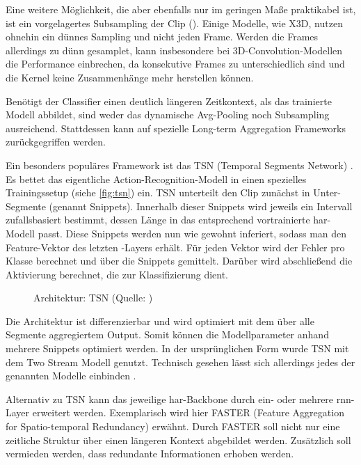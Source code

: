 Eine weitere Möglichkeit, die aber ebenfalls nur im geringen Maße praktikabel ist, ist ein vorgelagertes Subsampling der Clip (\cite{Ng15}).
Einige Modelle, wie X3D, nutzen ohnehin ein dünnes Sampling und nicht jeden Frame.
Werden die Frames allerdings zu dünn gesamplet, kann insbesondere bei 3D-Convolution-Modellen die Performance einbrechen, da konsekutive Frames zu unterschiedlich sind und die Kernel keine Zusammenhänge mehr herstellen können.

Benötigt der Classifier einen deutlich längeren Zeitkontext, als das trainierte Modell abbildet, sind weder das dynamische Avg-Pooling noch Subsampling ausreichend.
Stattdessen kann auf spezielle Long-term Aggregation Frameworks zurückgegriffen werden.

Ein besonders populäres Framework ist das TSN (Temporal Segments Network) \cite{Wang16} \cite{Wang19}.
Es bettet das eigentliche Action-Recognition-Modell in einen spezielles Trainingssetup (siehe \autoref{fig:tsn}) ein.
TSN unterteilt den Clip zunächst in Unter-Segmente (genannt Snippets).
Innerhalb dieser Snippets wird jeweils ein Intervall zufallsbasiert bestimmt, dessen Länge in das entsprechend vortrainierte \gls{har}-Modell passt.
Diese Snippets werden nun wie gewohnt inferiert, sodass man den Feature-Vektor des letzten \fc-Layers erhält.
Für jeden Vektor wird der Fehler pro Klasse berechnet und über die Snippets gemittelt.
Darüber wird abschließend die Aktivierung berechnet, die zur Klassifizierung dient.

\begin{figure}[h!]
    \centering
    \caption{Architektur: TSN (Quelle: \cite{Wang19})}
    \label{fig:tsn}
\end{figure}

Die Architektur ist differenzierbar und wird optimiert mit dem über alle Segmente aggregiertem Output.
Somit können die Modellparameter anhand mehrere Snippets optimiert werden.
In der ursprünglichen Form wurde TSN mit dem Two Stream Modell genutzt.
Technisch gesehen lässt sich allerdings jedes der genannten Modelle einbinden \cite{Kothawade19}.

Alternativ zu TSN kann das jeweilige \gls{har}-Backbone durch ein- oder mehrere \gls{rnn}-Layer erweitert werden.
Exemplarisch wird hier FASTER (Feature Aggregation for Spatio-temporal Redundancy) \cite{Zhu19} erwähnt.
Durch FASTER soll nicht nur eine zeitliche Struktur über einen längeren Kontext abgebildet werden.
Zusätzlich soll vermieden werden, dass redundante Informationen erhoben werden.

